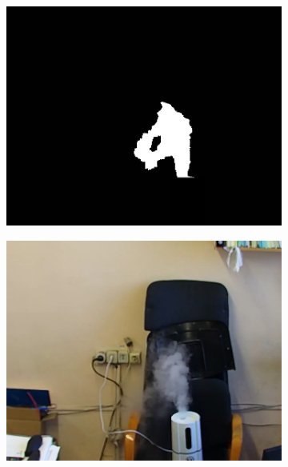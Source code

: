 \documentclass[14pt, a4paper]{extreport}
\begin{document}
\begin{figure}[h!]
\begin{subfigure}{.32\textwidth}
			\includegraphics[width = \textwidth]{image/chapter_3/examples/mask/206}
		\end{subfigure}
		\begin{subfigure}{.32\textwidth}
			\centering
			\includegraphics[width = \textwidth]{image/chapter_3/examples/img/214}
		\end{subfigure}
		\begin{subfigure}{.32\textwidth}
			\centering

\end{subfigure}
\end{figure}
\end{document}
